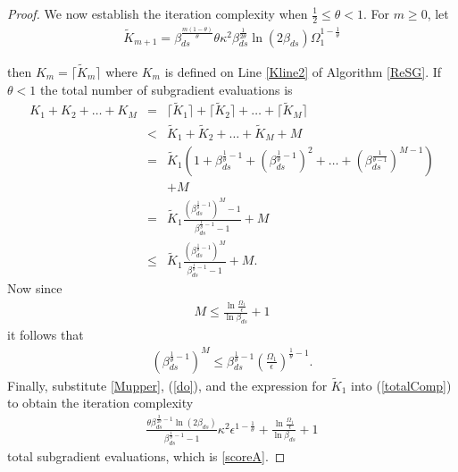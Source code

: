 \begin{proof}
 We now establish the iteration complexity when $\frac{1}{2}\leq\theta<1$.
For $m\geq 0$, let 
\begin{align}\label{defKtild}
\tilde{K}_{m+1} =      \beta_{ds}^{\frac{m(1-\theta)}{\theta}}\theta
\kappa^2\beta_{ds}^{\frac{1}{2\theta}}\ln\left(2\beta_{ds}\right)
\Omega_1^{1-\frac{1}{\theta}}
\end{align}
 
then $K_m = \lceil \tilde{K}_m\rceil$ where $K_m$ is defined on Line \ref{Kline2} of Algorithm \ref{ReSG}. 
If $\theta<1$ 
the total number of subgradient evaluations is
 \begin{eqnarray}\nonumber
    K_1 + K_2 +\ldots+ K_M
    &=&
 \lceil \tilde{K}_1\rceil +\lceil \tilde{K}_2\rceil +\ldots +\lceil \tilde{K}_M\rceil
 \\\nonumber
 &<&
   \tilde{K}_1 + \tilde{K}_2 +\ldots+ \tilde{K}_M
  +
  M
  \\\nonumber 
 &=&
 \tilde{K}_1
\left(
1+\beta_{ds}^{\frac{1}{\theta}-1}
+
(\beta_{ds}^{\frac{1}{\theta}-1})^2
+
\ldots
+
(\beta_{ds}^{\frac{1}{\theta-1}})^{M-1}
\right)
\\\nonumber
&&+M
\\\nonumber
&=&
\tilde{K}_1\frac{(\beta_{ds}^{\frac{1}{\theta}-1})^M - 1}{\beta_{ds}^{\frac{1}{\theta}-1}-1}
+
M
\\\label{totalComp} 
&\leq&
\tilde{K}_1\frac{(\beta_{ds}^{\frac{1}{\theta}-1})^M}{\beta_{ds}^{\frac{1}{\theta}-1}-1}
+M
.
 \end{eqnarray}
Now since
\begin{align}
M\leq \frac{\ln\frac{\Omega_1}{\epsilon}}{\ln\beta_{ds}}+1\label{Mupper}
\end{align} 
it follows that
\begin{eqnarray}
(\beta_{ds}^{\frac{1}{\theta}-1})^M\leq 
\beta_{ds}^{\frac{1}{\theta}-1}
\left(\frac{\Omega_1}{\epsilon}\right)^{\frac{1}{\theta}-1}.\label{do}
\end{eqnarray}
Finally, substitute \eqref{Mupper}, (\ref{do}), and the expression for $\tilde{K}_1$ into  (\ref{totalComp}) to obtain the iteration complexity 
\begin{eqnarray}\label{eq25new} 
\frac{\theta
	\beta_{ds}^{\frac{3}{2\theta}-1}\ln(2\beta_{ds})}{\beta_{ds}^{\frac{1}{\theta}-1}-1
} 
\kappa^2
\epsilon^{1-\frac{1}{\theta}}
+
\frac{\ln\frac{\Omega_1}{\epsilon}}{\ln\beta_{ds}}+1
\end{eqnarray}
total subgradient evaluations,
which is \eqref{scoreA}. 


\end{proof}
